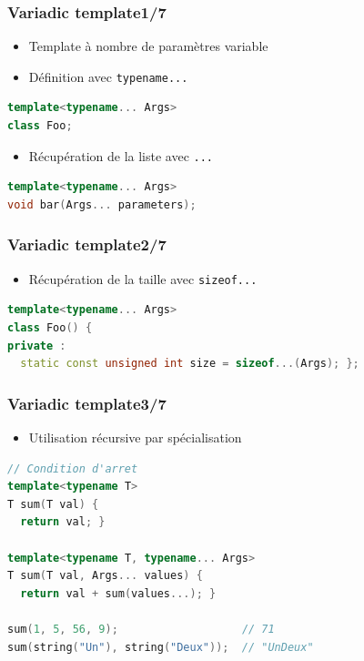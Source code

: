 \documentclass[C++.tex]{subfiles}
\begin{document}
\begin{frame}[fragile]
	\frametitle{Variadic template\titlehfill{}1/7}
	\begin{itemize}
		\item Template à nombre de paramètres variable
		\item Définition avec \lstinline|typename...|
	\end{itemize}

	\begin{lstlisting}[language=C++]
template<typename... Args>
class Foo;\end{lstlisting}

	\begin{itemize}
		\item Récupération de la liste avec \lstinline|...|
	\end{itemize}

	\begin{lstlisting}[language=C++]
template<typename... Args>
void bar(Args... parameters);\end{lstlisting}
\end{frame}

\begin{frame}[fragile]
	\frametitle{Variadic template\titlehfill{}2/7}
	\begin{itemize}
		\item Récupération de la taille avec \lstinline|sizeof...|
	\end{itemize}

	\begin{lstlisting}[language=C++]
template<typename... Args>
class Foo() {
private :
  static const unsigned int size = sizeof...(Args); };\end{lstlisting}
\end{frame}

\begin{frame}[fragile]
	\frametitle{Variadic template\titlehfill{}3/7}
	\begin{itemize}
		\item Utilisation récursive par spécialisation
	\end{itemize}

	\begin{lstlisting}[language=C++]
// Condition d'arret
template<typename T>
T sum(T val) {
  return val; }

template<typename T, typename... Args>
T sum(T val, Args... values) {
  return val + sum(values...); }

sum(1, 5, 56, 9);                   // 71
sum(string("Un"), string("Deux"));  // "UnDeux"\end{lstlisting}

\end{frame}
\end{document}
